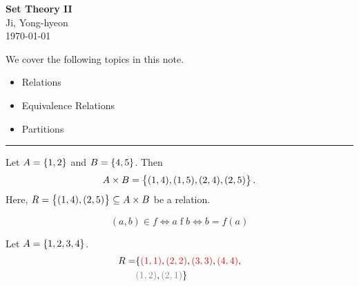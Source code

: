 \documentclass[11pt,openany]{article}
\begin{document}
\begin{center}
	\huge\textbf{Set Theory II}\\
	\vspace{0.5em}
	\large{Ji, Yong-hyeon}\\
	\vspace{0.5em}
	\normalsize{\today}\\
\end{center}

\noindent We cover the following topics in this note.
\begin{itemize}
	\item Relations
	\item Equivalence Relations
	\item Partitions
\end{itemize}
\hrule\vspace{12pt}

\begin{example*}
	Let $A=\set{1,2}$ and $B=\set{4,5}$. Then \[
	A\times B=\set{(1,4),(1,5),(2,4),(2,5)}.
	\] Here, $R=\set{(1,4),(2,5)}\subseteq A\times B$ be a relation.
\end{example*}

\begin{example*}
	\[
	(a,b)\in f\iff a\mathrel{f}b\iff b=f(a)
	\]
\end{example*}


\begin{example*}
	Let $A=\set{1,2,3,4}$. \begin{align*}
		R=&\{\textcolor{red}{(1,1)},\textcolor{red}{(2,2)},\textcolor{red}{(3,3)},\textcolor{red}{(4,4)}, \\
		&\textcolor{gray}{(1,2)},\textcolor{gray}{(2,1)}\}
	\end{align*}
\end{example*}
\end{document}
